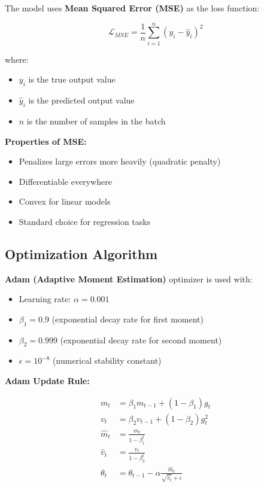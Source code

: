 \documentclass[12pt,a4paper]{article}
\begin{document}
The model uses \textbf{Mean Squared Error (MSE)} as the loss function:

\begin{equation}
    \mathcal{L}_{MSE} = \frac{1}{n}\sum_{i=1}^{n}(y_i - \hat{y}_i)^2
\end{equation}

where:
\begin{itemize}
    \item $y_i$ is the true output value
    \item $\hat{y}_i$ is the predicted output value
    \item $n$ is the number of samples in the batch
\end{itemize}

\textbf{Properties of MSE:}
\begin{itemize}
    \item Penalizes large errors more heavily (quadratic penalty)
    \item Differentiable everywhere
    \item Convex for linear models
    \item Standard choice for regression tasks
\end{itemize}

\subsection{Optimization Algorithm}

\textbf{Adam (Adaptive Moment Estimation)} optimizer is used with:

\begin{itemize}
    \item Learning rate: $\alpha = 0.001$
    \item $\beta_1 = 0.9$ (exponential decay rate for first moment)
    \item $\beta_2 = 0.999$ (exponential decay rate for second moment)
    \item $\epsilon = 10^{-8}$ (numerical stability constant)
\end{itemize}

\textbf{Adam Update Rule:}

\begin{align}
    m_t &= \beta_1 m_{t-1} + (1-\beta_1)g_t \\
    v_t &= \beta_2 v_{t-1} + (1-\beta_2)g_t^2 \\
    \hat{m}_t &= \frac{m_t}{1-\beta_1^t} \\
    \hat{v}_t &= \frac{v_t}{1-\beta_2^t} \\
    \theta_t &= \theta_{t-1} - \alpha \frac{\hat{m}_t}{\sqrt{\hat{v}_t} + \epsilon}
\end{align}
\end{document}
